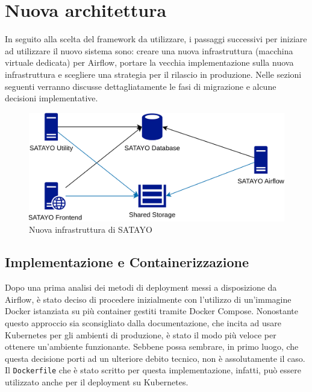 \chapter{Nuova architettura}
\label{cha:nuova_architettura}

In seguito alla scelta del framework da utilizzare, i passaggi successivi per iniziare
ad utilizzare il nuovo sistema sono: creare una nuova infrastruttura (macchina virtuale
dedicata) per Airflow, portare la vecchia implementazione sulla nuova infrastruttura
e scegliere una strategia per il rilascio in produzione. Nelle sezioni seguenti
verranno discusse dettagliatamente le fasi di migrazione e alcune decisioni
implementative.

\begin{figure}[htbp]
  \centering
  \includegraphics[width=.6\linewidth]{images/SATAYO_infrastructure_new.png}
  \caption{Nuova infrastruttura di SATAYO}
  \label{fig:infra_new}
\end{figure}

\section{Implementazione e Containerizzazione}
\label{sec:impl_container}

Dopo una prima analisi dei metodi di deployment messi a disposizione da Airflow,
è stato deciso di procedere inizialmente con l'utilizzo di un'immagine Docker\cite{docker}
istanziata su più container gestiti tramite Docker Compose. Nonostante questo approccio
sia sconsigliato dalla documentazione, che incita ad usare Kubernetes per gli
ambienti di produzione, è stato il modo più veloce per ottenere un'ambiente funzionante.
Sebbene possa sembrare, in primo luogo, che questa decisione porti ad un
ulteriore debito tecnico, non è assolutamente il caso. Il \texttt{Dockerfile} che
è stato scritto per questa implementazione, infatti, può essere utilizzato anche
per il deployment su Kubernetes.

